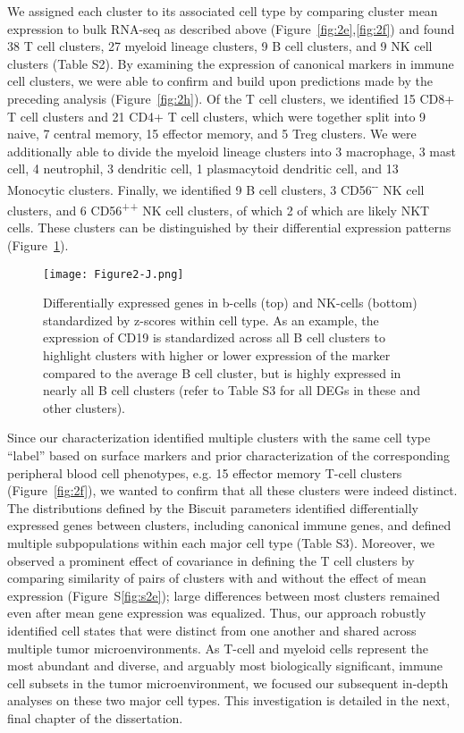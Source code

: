 We assigned each cluster to its associated cell type by comparing cluster mean expression to bulk RNA-seq as described above (Figure~\ref{fig:2e},\ref{fig:2f}) and found 38 T cell clusters, 27 myeloid lineage clusters, 9 B cell clusters, and 9 NK cell clusters (Table S2). %
By examining the expression of canonical markers in immune cell clusters, we were able to confirm and build upon predictions made by the preceding analysis (Figure~\ref{fig:2h}).
Of the T cell clusters, we identified 15 CD8+ T cell clusters and 21 CD4+ T cell clusters, which were together split into 9 naive, 7 central memory, 15 effector memory, and 5 Treg clusters.
We were additionally able to divide the myeloid lineage clusters into 3 macrophage, 3 mast cell, 4 neutrophil, 3 dendritic cell, 1 plasmacytoid dendritic cell, and 13 Monocytic clusters.
Finally, we identified 9 B cell clusters, 3 CD56\textsuperscript{-\/-} NK cell clusters, and 6 CD56\textsuperscript{++} NK cell clusters, of which 2 of which are likely NKT cells.
These clusters can be distinguished by their differential expression patterns (Figure~\ref{fig:2j}).

\begin{figure}
\centering
\texttt{[image: Figure2-J.png]}
  \caption{Differentially expressed genes in b-cells (top) and NK-cells (bottom) standardized by z-scores within cell type.
  As an example, the expression of CD19 is standardized across all B cell clusters to highlight clusters with higher or lower expression of the marker compared to the average B cell cluster, but is highly expressed in nearly all B cell clusters (refer to Table S3 for all DEGs in these and other clusters).
}
\label{fig:2j}
\end{figure}

Since our characterization identified multiple clusters with the same cell type ``label'' based on surface markers and prior characterization of the corresponding peripheral blood cell phenotypes, e.g.  15 effector memory T-cell clusters (Figure~\ref{fig:2f}), we wanted to confirm that all these clusters were indeed distinct.
The distributions defined by the Biscuit parameters identified differentially expressed genes between clusters, including canonical immune genes, and defined multiple subpopulations within each major cell type (Table S3). %
Moreover, we observed a prominent effect of covariance in defining the T cell clusters by comparing similarity of pairs of clusters with and without the effect of mean expression (Figure~S\ref{fig:s2e}); large differences between most clusters remained even after mean gene expression was equalized.
Thus, our approach robustly identified cell states that were distinct from one another and shared across multiple tumor microenvironments.
As T-cell and myeloid cells represent the most abundant and diverse, and arguably most biologically significant, immune cell subsets in the tumor microenvironment, we focused our subsequent in-depth analyses on these two major cell types.
This investigation is detailed in the next, final chapter of the dissertation. 

